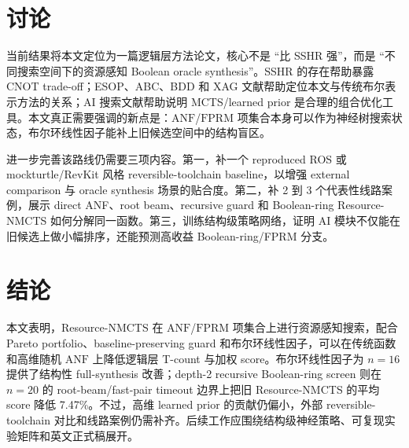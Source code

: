 \documentclass[UTF8,fontset=macnew,11pt]{ctexart}
\newcommand{\method}{Resource-NMCTS}
\newcommand{\anf}{\ensuremath{\mathrm{ANF}}}
\newcommand{\fprm}{\ensuremath{\mathrm{FPRM}}}
\begin{document}
\section{讨论}

当前结果将本文定位为一篇逻辑层方法论文，核心不是 ``比 SSHR 强''，而是 ``不同搜索空间下的资源感知 Boolean oracle synthesis''。SSHR 的存在帮助暴露 CNOT trade-off；ESOP、ABC、BDD 和 XAG 文献帮助定位本文与传统布尔表示方法的关系；AI 搜索文献帮助说明 MCTS/learned prior 是合理的组合优化工具。本文真正需要强调的新点是：\anf{}/\fprm{} 项集合本身可以作为神经树搜索状态，布尔环线性因子能补上旧候选空间中的结构盲区。

进一步完善该路线仍需要三项内容。第一，补一个 reproduced ROS 或 mockturtle/RevKit 风格 reversible-toolchain baseline，以增强 external comparison 与 oracle synthesis 场景的贴合度。第二，补 2 到 3 个代表性线路案例，展示 direct ANF、root beam、recursive guard 和 Boolean-ring \method{} 如何分解同一函数。第三，训练结构级策略网络，证明 AI 模块不仅能在旧候选上做小幅排序，还能预测高收益 Boolean-ring/FPRM 分支。

\section{结论}

本文表明，\method{} 在 \anf{}/\fprm{} 项集合上进行资源感知搜索，配合 Pareto portfolio、baseline-preserving guard 和布尔环线性因子，可以在传统函数和高维随机 \anf{} 上降低逻辑层 T-count 与加权 score。布尔环线性因子为 $n=16$ 提供了结构性 full-synthesis 改善；depth-2 recursive Boolean-ring screen 则在 $n=20$ 的 root-beam/fast-pair timeout 边界上把旧 \method{} 的平均 score 降低 7.47\%。不过，高维 learned prior 的贡献仍偏小，外部 reversible-toolchain 对比和线路案例仍需补齐。后续工作应围绕结构级神经策略、可复现实验矩阵和英文正式稿展开。
\end{document}
